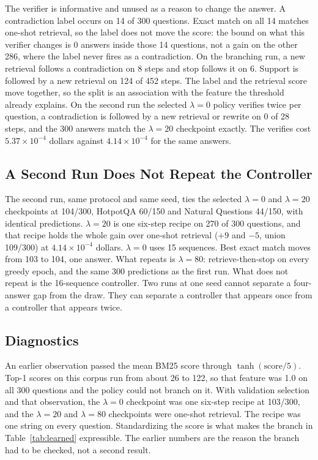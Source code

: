 \documentclass[letterpaper]{article} %
\begin{document}
The verifier is informative and unused as a reason to change the answer. A contradiction label occurs on 14 of 300 questions. Exact match on all 14 matches one-shot retrieval, so the label does not move the score: the bound on what this verifier changes is 0 answers inside those 14 questions, not a gain on the other 286, where the label never fires as a contradiction. On the branching run, a new retrieval follows a contradiction on 8 steps and stop follows it on 6. Support is followed by a new retrieval on 124 of 452 steps. The label and the retrieval score move together, so the split is an association with the feature the threshold already explains. On the second run the selected \(\lambda{=}0\) policy verifies twice per question, a contradiction is followed by a new retrieval or rewrite on 0 of 28 steps, and the 300 answers match the \(\lambda{=}20\) checkpoint exactly. The verifies cost \(5.37\times 10^{-4}\) dollars against \(4.14\times 10^{-4}\) for the same answers.

\subsection{A Second Run Does Not Repeat the Controller}
The second run, same protocol and same seed, ties the selected \(\lambda{=}0\) and \(\lambda{=}20\) checkpoints at 104/300, HotpotQA 60/150 and Natural Questions 44/150, with identical predictions. \(\lambda{=}20\) is one six-step recipe on 270 of 300 questions, and that recipe holds the whole gain over one-shot retrieval (\(+9\) and \(-5\), union 109/300) at \(4.14\times 10^{-4}\) dollars. \(\lambda{=}0\) uses 15 sequences. Best exact match moves from 103 to 104, one answer. What repeats is \(\lambda{=}80\): retrieve-then-stop on every greedy epoch, and the same 300 predictions as the first run. What does not repeat is the 16-sequence controller. Two runs at one seed cannot separate a four-answer gap from the draw. They can separate a controller that appears once from a controller that appears twice.

\subsection{Diagnostics}
An earlier observation passed the mean BM25 score through \(\tanh(\mathrm{score}/5)\). Top-1 scores on this corpus run from about 26 to 122, so that feature was 1.0 on all 300 questions and the policy could not branch on it. With validation selection and that observation, the \(\lambda{=}0\) checkpoint was one six-step recipe at 103/300, and the \(\lambda{=}20\) and \(\lambda{=}80\) checkpoints were one-shot retrieval. The recipe was one string on every question. Standardizing the score is what makes the branch in Table~\ref{tab:learned} expressible. The earlier numbers are the reason the branch had to be checked, not a second result.
\end{document}
